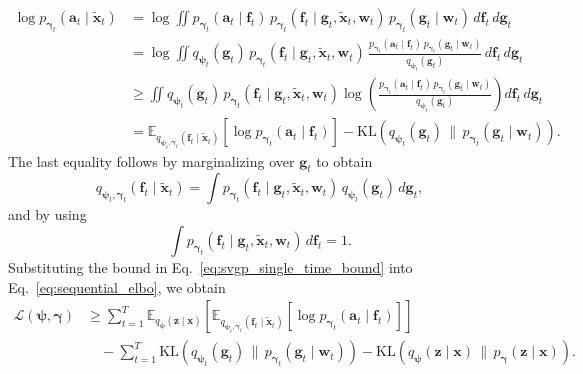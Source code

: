 \begin{align}
\log p_{\boldsymbol{\gamma}_t}(\mathbf{a}_t\mid \widetilde{\mathbf{x}}_t)
&=
\log \iint
p_{\boldsymbol{\gamma}_t}(\mathbf{a}_t\mid \mathbf{f}_t)\,
p_{\boldsymbol{\gamma}_t}(\mathbf{f}_t\mid \mathbf{g}_t,\widetilde{\mathbf{x}}_t,\mathbf{w}_t)\,
p_{\boldsymbol{\gamma}_t}(\mathbf{g}_t\mid \mathbf{w}_t)\,
d\mathbf{f}_t\,d\mathbf{g}_t
\nonumber\\
&=
\log \iint
q_{\boldsymbol{\psi}_t}(\mathbf{g}_t)\,
p_{\boldsymbol{\gamma}_t}(\mathbf{f}_t\mid \mathbf{g}_t,\widetilde{\mathbf{x}}_t,\mathbf{w}_t)\,
\frac{
p_{\boldsymbol{\gamma}_t}(\mathbf{a}_t\mid \mathbf{f}_t)\,
p_{\boldsymbol{\gamma}_t}(\mathbf{g}_t\mid \mathbf{w}_t)
}{
q_{\boldsymbol{\psi}_t}(\mathbf{g}_t)
}
\,d\mathbf{f}_t\,d\mathbf{g}_t
\nonumber\\
&\ge
\iint
q_{\boldsymbol{\psi}_t}(\mathbf{g}_t)\,
p_{\boldsymbol{\gamma}_t}(\mathbf{f}_t\mid \mathbf{g}_t,\widetilde{\mathbf{x}}_t,\mathbf{w}_t)
\log\!\left(
\frac{
p_{\boldsymbol{\gamma}_t}(\mathbf{a}_t\mid \mathbf{f}_t)\,
p_{\boldsymbol{\gamma}_t}(\mathbf{g}_t\mid \mathbf{w}_t)
}{
q_{\boldsymbol{\psi}_t}(\mathbf{g}_t)
}
\right)
d\mathbf{f}_t\,d\mathbf{g}_t
\nonumber\\
&=
\mathbb{E}_{q_{\boldsymbol{\psi}_t,\boldsymbol{\gamma}_t}(\mathbf{f}_t\mid \widetilde{\mathbf{x}}_t)}
\!\left[
\log p_{\boldsymbol{\gamma}_t}(\mathbf{a}_t\mid \mathbf{f}_t)
\right]
-
\mathrm{KL}\!\left(
q_{\boldsymbol{\psi}_t}(\mathbf{g}_t)
\,\big\|\,
p_{\boldsymbol{\gamma}_t}(\mathbf{g}_t\mid \mathbf{w}_t)
\right).
\label{eq:svgp_single_time_bound}
\end{align}
The last equality follows by marginalizing over \(\mathbf{g}_t\) to obtain
\[
q_{\boldsymbol{\psi}_t,\boldsymbol{\gamma}_t}(\mathbf{f}_t\mid \widetilde{\mathbf{x}}_t)
=
\int
p_{\boldsymbol{\gamma}_t}(\mathbf{f}_t\mid \mathbf{g}_t,\widetilde{\mathbf{x}}_t,\mathbf{w}_t)\,
q_{\boldsymbol{\psi}_t}(\mathbf{g}_t)\,d\mathbf{g}_t,
\]
and by using
\[
\int
p_{\boldsymbol{\gamma}_t}(\mathbf{f}_t\mid \mathbf{g}_t,\widetilde{\mathbf{x}}_t,\mathbf{w}_t)\,
d\mathbf{f}_t = 1.
\]
Substituting the bound in Eq.~\eqref{eq:svgp_single_time_bound} into
Eq.~\eqref{eq:sequential_elbo}, we obtain
\begin{align}
\mathcal{L}(\boldsymbol{\psi},\boldsymbol{\gamma})
&\ge
\sum_{t=1}^T
\mathbb{E}_{q_{\boldsymbol{\psi}}(\mathbf{z}\mid \mathbf{x})}
\!\left[
\mathbb{E}_{q_{\boldsymbol{\psi}_t,\boldsymbol{\gamma}_t}(\mathbf{f}_t\mid \widetilde{\mathbf{x}}_t)}
\!\left[
\log p_{\boldsymbol{\gamma}_t}(\mathbf{a}_t\mid \mathbf{f}_t)
\right]
\right]
\nonumber\\
&\quad
-
\sum_{t=1}^T
\mathrm{KL}\!\left(
q_{\boldsymbol{\psi}_t}(\mathbf{g}_t)
\,\big\|\,
p_{\boldsymbol{\gamma}_t}(\mathbf{g}_t\mid \mathbf{w}_t)
\right)
-
\mathrm{KL}\!\left(
q_{\boldsymbol{\psi}}(\mathbf{z}\mid \mathbf{x})
\,\big\|\,
p_{\boldsymbol{\gamma}}(\mathbf{z}\mid \mathbf{x})
\right).
\label{eq:seqgplvm_inducing_bound}
\end{align}
